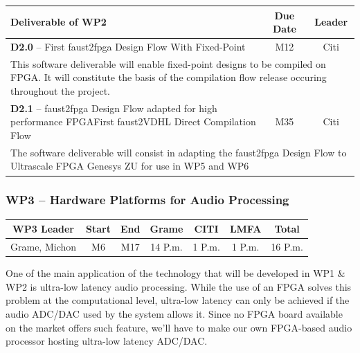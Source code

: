 \documentclass[a4paper,9pt]{extarticle}
\begin{document}
\begin{center}
\begin{tabular}{p{12cm} | c | c}
\textbf{Deliverable of WP2} & \textbf{Due Date} & \textbf{Leader}\\
\hline
\hline
\textbf{D2.0} -- First faust2fpga Design Flow With Fixed-Point & M12 & Citi\\
\hline
\multicolumn{3}{p{16cm}}{This software deliverable will enable fixed-point designs to be compiled on FPGA. It will constitute the basis of the compilation flow release occuring  throughout the project.}\\
\hline
\hline
\textbf{D2.1} -- faust2fpga Design Flow adapted for high performance FPGAFirst faust2VDHL Direct Compilation Flow & M35 & Citi\\
\hline
\multicolumn{3}{p{16cm}}{The software deliverable will consist in adapting the faust2fpga Design Flow to Ultrascale FPGA Genesys ZU for use in WP5 and WP6 }\\
\end{tabular}
\end{center}

\subsubsection{WP3 -- Hardware Platforms for Audio Processing}
\label{subsubsec:wp3}

\begin{center}
\begin{tabular}{c | c c | c c c | c}
\textbf{WP3 Leader} & \textbf{Start} & \textbf{End} & \textbf{Grame} & \textbf{CITI} & \textbf{LMFA} & \textbf{Total}\\
\hline
Grame, Michon & M6 & M17 & 14 P.m. & 1 P.m. & 1 P.m. & 16 P.m.
\end{tabular}
\end{center}

One of the main application of the technology that will be developed in WP1 \& WP2 is ultra-low latency audio processing. While the use of an FPGA solves this problem at the computational level, ultra-low latency can only be achieved if the audio ADC/DAC used by the system allows it. Since no FPGA board available on the market offers such feature, we'll have to make our own FPGA-based audio processor hosting ultra-low latency ADC/DAC. 
\end{document}
